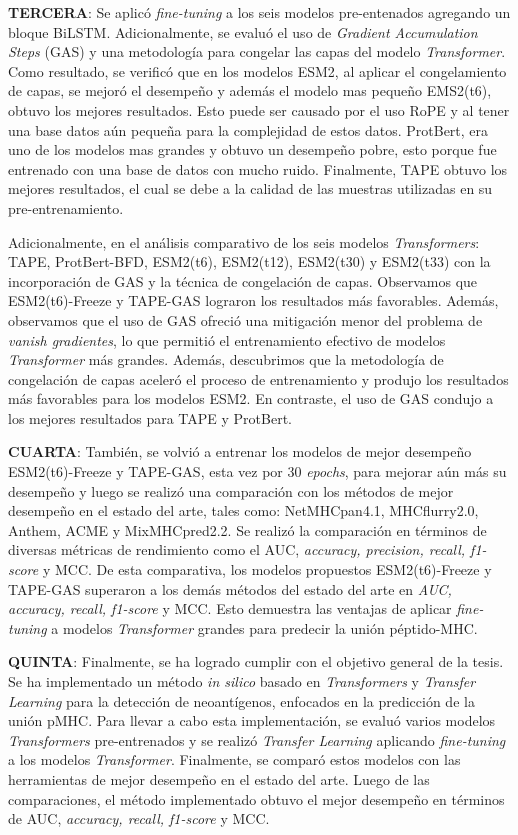 \textbf{TERCERA}: Se aplicó \textit{fine-tuning} a los seis modelos pre-entenados agregando un bloque BiLSTM. Adicionalmente, se evaluó el uso de \textit{Gradient Accumulation Steps} (GAS) y una metodología para congelar las capas del modelo \textit{Transformer}. Como resultado, se verificó que en los modelos ESM2, al aplicar el congelamiento de capas, se mejoró el desempeño y además el modelo mas pequeño EMS2(t6), obtuvo los mejores resultados. Esto puede ser causado por el uso RoPE y al tener una base datos aún pequeña para la complejidad de estos datos. ProtBert, era uno de los modelos mas grandes y obtuvo un desempeño pobre, esto porque fue entrenado con una base de datos con mucho ruido. Finalmente, TAPE obtuvo los mejores resultados, el cual se debe a la calidad de las muestras utilizadas en su pre-entrenamiento.


Adicionalmente, en el análisis comparativo de los seis modelos \textit{Transformers}: TAPE, ProtBert-BFD, ESM2(t6), ESM2(t12), ESM2(t30) y ESM2(t33) con la incorporación de GAS y la técnica de congelación de capas. Observamos que ESM2(t6)-Freeze y TAPE-GAS lograron los resultados más favorables. Además, observamos que el uso de GAS ofreció una mitigación menor del problema de \textit{vanish gradientes}, lo que permitió el entrenamiento efectivo de modelos \textit{Transformer} más grandes. Además, descubrimos que la metodología de congelación de capas aceleró el proceso de entrenamiento y produjo los resultados más favorables para los modelos ESM2. En contraste, el uso de GAS condujo a los mejores resultados para TAPE y ProtBert.

\textbf{CUARTA}: También, se volvió a entrenar los modelos de mejor desempeño ESM2(t6)-Freeze y TAPE-GAS, esta vez por 30 \textit{epochs}, para mejorar aún más su desempeño y luego se realizó una comparación con los métodos de mejor desempeño en el estado del arte, tales como: NetMHCpan4.1, MHCflurry2.0, Anthem, ACME y MixMHCpred2.2. Se realizó la comparación en términos de diversas métricas de rendimiento como el AUC, \textit{accuracy, precision, recall, f1-score} y MCC. De esta comparativa, los modelos propuestos ESM2(t6)-Freeze y TAPE-GAS superaron a los demás métodos del estado del arte en \textit{AUC, accuracy, recall, f1-score} y MCC. Esto demuestra las ventajas de aplicar \textit{fine-tuning} a modelos \textit{Transformer} grandes para predecir la unión péptido-MHC.



\textbf{QUINTA}: Finalmente, se ha logrado cumplir con el objetivo general de la tesis. Se ha implementado un método  \textit{in silico} basado en \textit{Transformers} y \textit{Transfer Learning} para la detección de neoantígenos, enfocados en la predicción de la unión pMHC. Para llevar a cabo esta implementación, se evaluó varios modelos \textit{Transformers} pre-entrenados y se realizó \textit{Transfer Learning} aplicando \textit{fine-tuning} a los modelos \textit{Transformer}. Finalmente, se comparó estos modelos con las herramientas de mejor desempeño en el estado del arte. Luego de las comparaciones, el método implementado obtuvo el mejor desempeño en términos de AUC, \textit{accuracy, recall, f1-score} y MCC.


